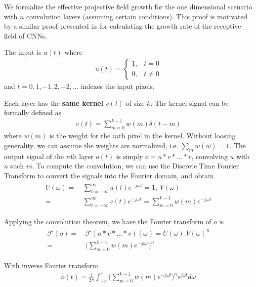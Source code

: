 We formalize the effective projective field growth for the one dimensional scenario with $n$ convolution layers (assuming certain conditions). This proof is motivated by a similar proof presented in \cite{luo2016understanding} for calculating the growth rate of the receptive field of CNNs.

The input is $u(t)$ where
\begin{align}
	u(t) = 
	\begin{cases}
		1, & t = 0\\
		0, & t \neq 0 
	\end{cases}
\end{align}
and $t = 0, 1, -1, 2, -2, ...$ indexes the input pixels.

Each layer has the \textbf{same kernel} $v(t)$ of size $k$. The kernel signal can be formally defined as
\begin{align}
	v(t) = \sum_{m=0}^{k-1} w(m)\delta(t-m)
\end{align}
where $w(m)$ is the weight for the $m$th pixel in the kernel.
Without loosing generality, we can assume the weights are normalized, i.e. $\sum_{m}w(w)=1$. The output signal of the $n$th layer $o(t)$ is simply $o = u * v * ... * v$, convolving $u$ with $n$ such $v$s.
To compute the convolution, we can use the Discrete Time Fourier Transform to convert the signals into the Fourier domain, and obtain
\begin{align}
\begin{split}
	U(\omega) =&~ \sum_{t=-\infty}^{\infty} u(t)e^{-j\omega t} = 1, ~V(\omega) \\=&~ \sum_{t=-\infty}^{\infty} v(t)e^{-j\omega t} = \sum_{m=0}^{k-1} w(m)e^{-j\omega t}
\end{split}
\end{align}

Applying the convolution theorem, we have the Fourier transform of $o$ is
\begin{align}
\begin{split}
	\mathcal{F}(o) =&~ \mathcal{F}(u*v*...*v)(\omega) = U(\omega) . V(\omega)^n \\=&~ \Bigg(\sum_{m=0}^{k-1}w(m)e^{-j\omega t}\Bigg)^n
\end{split}
\end{align}

With inverse Fourier transform
\begin{align}
	o(t) = \frac{1}{2\pi}\int_{-\pi}^{\pi}\Big(\sum_{m=0}^{k-1}w(m)e^{-j\omega t}\Big)^ne^{j\omega t} d\omega
\end{align}

